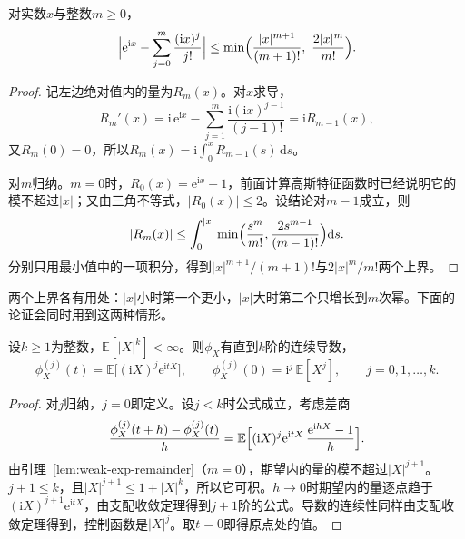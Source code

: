 \begin{lemma}[复指数的展开误差]
\label{lem:weak-exp-remainder}
对实数$x$与整数$m\geq0$，
\begin{equation}
 \Bigl\lvert\mathrm{e}^{\mathrm{i}x}-\sum_{j=0}^{m}\frac{(\mathrm{i}x)^{j}}{j!}\Bigr\rvert\leq\min\Bigl(\frac{\lvert x\rvert^{m+1}}{(m+1)!},\ \frac{2\lvert x\rvert^{m}}{m!}\Bigr) .
 \label{eq:weak-exp-remainder}
\end{equation}
\end{lemma}

\begin{proof}
记左边绝对值内的量为$R_m(x)$。对$x$求导，
\[
 R_m'(x)=\mathrm{i}\,\mathrm{e}^{\mathrm{i}x}-\sum_{j=1}^{m}\frac{\mathrm{i}(\mathrm{i}x)^{j-1}}{(j-1)!}=\mathrm{i}R_{m-1}(x) ,
\]
又$R_m(0)=0$，所以$R_m(x)=\mathrm{i}\int_0^xR_{m-1}(s)\,\mathrm{d}s$。

对$m$归纳。$m=0$时，$R_0(x)=\mathrm{e}^{\mathrm{i}x}-1$，前面计算高斯特征函数时已经说明它的模不超过$\lvert x\rvert$；又由三角不等式，$\lvert R_0(x)\rvert\leq2$。设结论对$m-1$成立，则
\[
 \lvert R_m(x)\rvert\leq\int_0^{\lvert x\rvert}\min\Bigl(\frac{s^{m}}{m!},\frac{2s^{m-1}}{(m-1)!}\Bigr)\mathrm{d}s .
\]
分别只用最小值中的一项积分，得到$\lvert x\rvert^{m+1}/(m+1)!$与$2\lvert x\rvert^{m}/m!$两个上界。
\end{proof}

两个上界各有用处：$\lvert x\rvert$小时第一个更小，$\lvert x\rvert$大时第二个只增长到$m$次幂。下面的论证会同时用到这两种情形。

\begin{theorem}[矩与导数]
\label{thm:weak-cf-derivatives}
设$k\geq1$为整数，$\mathbb{E}[\lvert X\rvert^{k}]<\infty$。则$\phi_X$有直到$k$阶的连续导数，
\begin{equation}
 \phi_X^{(j)}(t)=\mathbb{E}\bigl[(\mathrm{i}X)^{j}\mathrm{e}^{\mathrm{i}tX}\bigr],\qquad
 \phi_X^{(j)}(0)=\mathrm{i}^{j}\,\mathbb{E}[X^{j}],\qquad j=0,1,\dots,k .
 \label{eq:weak-cf-derivatives}
\end{equation}
\end{theorem}

\begin{proof}
对$j$归纳，$j=0$即定义。设$j<k$时公式成立，考虑差商
\[
 \frac{\phi_X^{(j)}(t+h)-\phi_X^{(j)}(t)}{h}=\mathbb{E}\Bigl[(\mathrm{i}X)^{j}\mathrm{e}^{\mathrm{i}tX}\,\frac{\mathrm{e}^{\mathrm{i}hX}-1}{h}\Bigr] .
\]
由引理~\ref{lem:weak-exp-remainder}（$m=0$），期望内的量的模不超过$\lvert X\rvert^{j+1}$。$j+1\leq k$，且$\lvert X\rvert^{j+1}\leq1+\lvert X\rvert^{k}$，所以它可积。$h\to0$时期望内的量逐点趋于$(\mathrm{i}X)^{j+1}\mathrm{e}^{\mathrm{i}tX}$，由支配收敛定理得到$j+1$阶的公式。导数的连续性同样由支配收敛定理得到，控制函数是$\lvert X\rvert^{j}$。取$t=0$即得原点处的值。
\end{proof}

